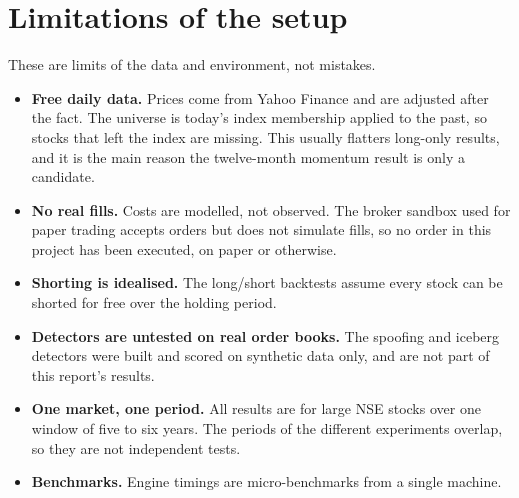 \section{Limitations of the setup}\label{sec:limitations}
These are limits of the data and environment, not mistakes.

\begin{itemize}
\item \textbf{Free daily data.} Prices come from Yahoo Finance and are adjusted after the fact. The universe is today's index membership applied to the past, so stocks that left the index are missing. This usually flatters long-only results, and it is the main reason the twelve-month momentum result is only a candidate.
\item \textbf{No real fills.} Costs are modelled, not observed. The broker sandbox used for paper trading accepts orders but does not simulate fills, so no order in this project has been executed, on paper or otherwise.
\item \textbf{Shorting is idealised.} The long/short backtests assume every stock can be shorted for free over the holding period.
\item \textbf{Detectors are untested on real order books.} The spoofing and iceberg detectors were built and scored on synthetic data only, and are not part of this report's results.
\item \textbf{One market, one period.} All results are for large NSE stocks over one window of five to six years. The periods of the different experiments overlap, so they are not independent tests.
\item \textbf{Benchmarks.} Engine timings are micro-benchmarks from a single machine.
\end{itemize}
